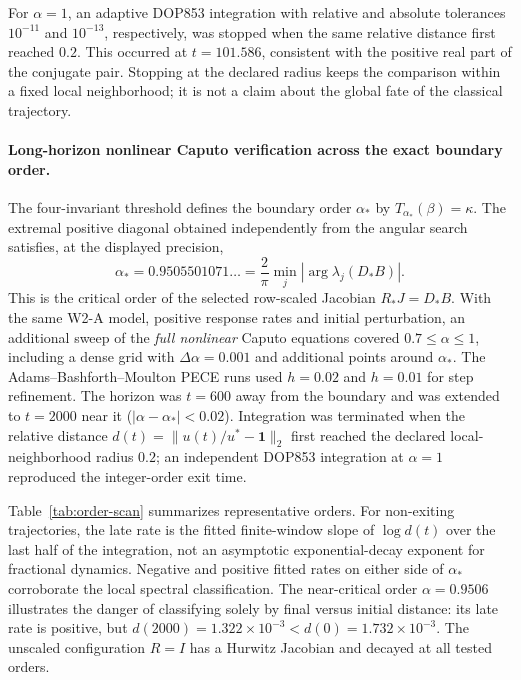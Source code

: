 For \(\alpha=1\), an adaptive DOP853 integration with relative and absolute tolerances \(10^{-11}\) and \(10^{-13}\), respectively, was stopped when the same relative distance first reached \(0.2\). This occurred at \(t=101.586\), consistent with the positive real part of the conjugate pair. Stopping at the declared radius keeps the comparison within a fixed local neighborhood; it is not a claim about the global fate of the classical trajectory.

\paragraph{Long-horizon nonlinear Caputo verification across the exact boundary order.}
The four-invariant threshold defines the boundary order \(\alpha_*\) by
\(T_{\alpha_*}(\beta)=\kappa\). The extremal positive diagonal obtained
independently from the angular search satisfies, at the displayed precision,
\[
 \alpha_* =0.9505501071\ldots
 =\frac{2}{\pi}\min_j|\arg\lambda_j(D_*B)| .
\]
This is the critical order of the selected row-scaled
Jacobian \(R_*J=D_*B\). With the same W2-A model, positive response rates
and initial perturbation, an additional sweep of the \emph{full nonlinear}
Caputo equations covered \(0.7\le\alpha\le1\), including a dense grid
with \(\Delta\alpha=0.001\) and additional points around \(\alpha_*\).
The Adams--Bashforth--Moulton PECE runs used \(h=0.02\) and
\(h=0.01\) for step refinement. The horizon was \(t=600\) away from
the boundary and was extended to \(t=2000\) near it
(\(|\alpha-\alpha_*|<0.02\)). Integration was terminated when the
relative distance \(d(t)=\|u(t)/u^*-\mathbf1\|_2\) first reached
the declared local-neighborhood radius \(0.2\);
an independent DOP853 integration at \(\alpha=1\) reproduced
the integer-order exit time.

Table~\ref{tab:order-scan} summarizes representative orders.
For non-exiting trajectories, the late rate is the fitted
finite-window slope of \(\log d(t)\) over the last half
of the integration, not an asymptotic exponential-decay
exponent for fractional dynamics.
Negative and positive fitted rates on either side of
\(\alpha_*\) corroborate the local spectral classification.
The near-critical order \(\alpha=0.9506\) illustrates
the danger of classifying solely by final versus initial distance:
its late rate is positive, but
\(d(2000)=1.322\times10^{-3}<d(0)=1.732\times10^{-3}\).
The unscaled configuration \(R=I\) has a Hurwitz Jacobian and
decayed at all tested orders.

